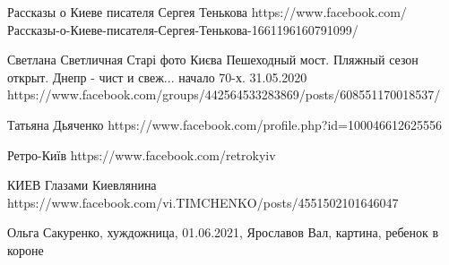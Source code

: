  
 
 
 
 


Рассказы о Киеве писателя Сергея Тенькова
https://www.facebook.com/Рассказы-о-Киеве-писателя-Сергея-Тенькова-1661196160791099/

Светлана Светличная
Старі фото Києва
Пешеходный мост. Пляжный сезон открыт. Днепр - чист и свеж... начало 70-х.
31.05.2020
https://www.facebook.com/groups/442564533283869/posts/608551170018537/

Татьяна Дьяченко
https://www.facebook.com/profile.php?id=100046612625556

Ретро-Київ
https://www.facebook.com/retrokyiv

КИЕВ Глазами Киевлянина
https://www.facebook.com/vi.TIMCHENKO/posts/4551502101646047

Ольга Сакуренко, хуждожница, 01.06.2021, Ярославов Вал, картина, ребенок в короне
